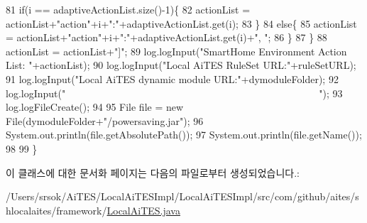 \begin{DoxyCode}
81              \textcolor{keywordflow}{if}(i == adaptiveActionList.size()-1)\{
82                  actionList = actionList+\textcolor{stringliteral}{"action"}+i+\textcolor{stringliteral}{":"}+adaptiveActionList.get(i);
83              \}
84              \textcolor{keywordflow}{else}\{
85                  actionList = actionList+\textcolor{stringliteral}{"action"}+i+\textcolor{stringliteral}{":"}+adaptiveActionList.get(i)+\textcolor{stringliteral}{", "};
86              \}  
87         \}
88         actionList = actionList+\textcolor{stringliteral}{"]"};
89         log.logInput(\textcolor{stringliteral}{"SmartHome Environment Action List: "}+actionList);
90         log.logInput(\textcolor{stringliteral}{"Local AiTES RuleSet URL:"}+ruleSetURL);
91         log.logInput(\textcolor{stringliteral}{"Local AiTES dynamic module URL:"}+dymoduleFolder);
92         log.logInput(\textcolor{stringliteral}{"~~~~~~~~~~~~~~~~~~~~~~~~~~~~~~~~~~~~~~~~~~~~~~~~~~~"});
93         log.logFileCreate();
94         
95         File file = \textcolor{keyword}{new} File(dymoduleFolder+\textcolor{stringliteral}{"/powersaving.jar"});
96         System.out.println(file.getAbsolutePath());
97         System.out.println(file.getName());
98 
99     \}
\end{DoxyCode}


이 클래스에 대한 문서화 페이지는 다음의 파일로부터 생성되었습니다.\+:\begin{DoxyCompactItemize}
\item 
/\+Users/srsok/\+Ai\+T\+E\+S/\+Local\+Ai\+T\+E\+S\+Impl/\+Local\+Ai\+T\+E\+S\+Impl/src/com/github/aites/shlocalaites/framework/\mbox{\hyperlink{_local_ai_t_e_s_8java}{Local\+Ai\+T\+E\+S.\+java}}\end{DoxyCompactItemize}
